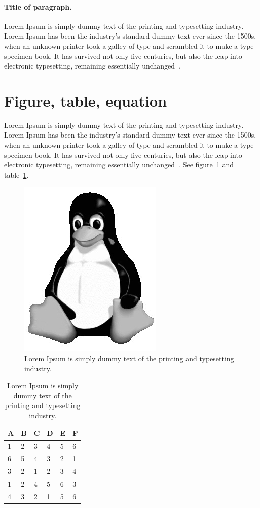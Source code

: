 \documentclass[10pt, a4paper]{article}
\begin{document}
\paragraph{Title of paragraph.}
Lorem Ipsum is simply dummy text of the printing and typesetting industry. Lorem Ipsum has been the industry's standard dummy text ever since the 1500s, when an unknown printer took a galley of type and scrambled it to make a type specimen book. It has survived not only five centuries, but also the leap into electronic typesetting, remaining essentially unchanged~\citep{Magnetism}.

\section{Figure, table, equation}
Lorem Ipsum is simply dummy text of the printing and typesetting industry. Lorem Ipsum has been the industry's standard dummy text ever since the 1500s, when an unknown printer took a galley of type and scrambled it to make a type specimen book. It has survived not only five centuries, but also the leap into electronic typesetting, remaining essentially unchanged~\citep{Magnetism}. See figure~\ref{tab: table-1} and table~\ref{fig:logo}.

\begin{figure}[tbp]
	\centering
	\includegraphics[width=0.35\linewidth]{gfx}
	\caption{Lorem Ipsum is simply dummy text of the printing and typesetting industry.}
	\label{fig:logo}
\end{figure}
 
\begin{table}[tbp]
	\centering
	\caption{Lorem Ipsum is simply dummy text of the printing and typesetting industry.}
	\label{tab: table-1}
  \begin{tabular}{p{1cm}p{1cm}p{1cm}p{1cm}p{1cm}p{1cm}}
	\hline 
	A & B &  C &  D & E & F \\ 
	\hline 
	1 & 2 & 3 & 4 & 5 & 6 \\ 	
	6 & 5 & 4 & 3 & 2 & 1 \\ 
	3 & 2 & 1 & 2 & 3 & 4 \\ 
	1 & 2 & 4 & 5 & 6 & 3 \\ 
	4 & 3 & 2 & 1 & 5 & 6 \\ 
	\hline 
\end{tabular} 	
\end{table}  
\end{document}
